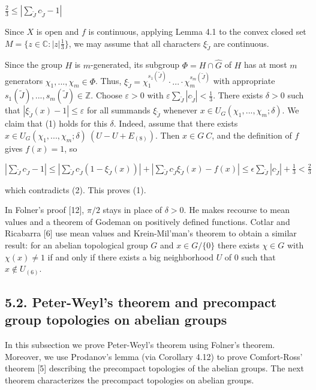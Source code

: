 \documentclass[12pt]{article}
\begin{document}
    $\frac{2}{3} \leqslant |\sum_{\tilde{J}} c_{\tilde{J}} - 1|$


    Since $X$ is open and $f$ is continuous, applying Lemma 4.1 to the convex closed set $M = \{z \in \mathbb{C}: |z|  \frac{1}{3}\}$, we may assume
that all characters $\xi_{\tilde{J}}$ are continuous.


Since the group $H$ is $m$-generated, its subgroup $\Phi = H \cap \hat{G}$ of $H$ has at most $m$ generators $\chi_1,...,\chi_m \in \Phi$. Thus,
$\xi_{\tilde{J}} = \chi^{s_1(\tilde{J})}_1 \cdot ... \cdot \chi^{s_m(\tilde{J})}_m$ with appropriate $s_1(\tilde{J}), . . . , s_m(\tilde{J}) \in \mathbb{Z}$. Choose $\varepsilon > 0$ with $\varepsilon \sum_\tilde{J} |c_\tilde{J}| < \frac{1}{3}$. There exists $\delta > 0$ such that
$|\xi_{\tilde{J}}(x) - 1| \leqslant \varepsilon$ for all summands $\xi_{\tilde{J}}$ whenever $x \in U_G (\chi_1,...,\chi_m; \delta)$. We claim that (1) holds for this $\delta$. Indeed, assume that
there exists $x \in U_G (\chi_1,...,\chi_m; \delta) \ (U - U + E_{(8)})$. Then $x \in G \ C$, and the definition of $f$ gives $f(x) = 1$, so


$|\sum_{\tilde{J}} c_{\tilde{J}} - 1| \leqslant |\sum_{\tilde{J}} c_{\tilde{J}}(1 - \xi_{\tilde{J}}(x))| + |\sum_{\tilde{J}} c_{\tilde{J}} \xi_{\tilde{J}}(x) - f(x)| \leqslant \epsilon \sum_{\tilde{J}} |c_{\tilde{J}}| + \frac{1}{3} < \frac{2}{3}$


which contradicts (2). This proves (1). 


    In Folner's proof [12], $\pi /2$ stays in place of $\delta > 0$. He makes recourse to mean values and a theorem of Godeman on
positively defined functions. Cotlar and Ricabarra [6] use mean values and Krein-Mil'man's theorem to obtain a similar
result: for an abelian topological group $G$ and $x \in G / \{0\}$ there exists $\chi \in G$ with $\chi(x) \neq 1$ if and only if there exists a big
neighborhood $U$ of 0 such that $x \notin  U_{(6)}$.


\subsection{5.2. Peter-Weyl's theorem and precompact group topologies on abelian groups}


    In this subsection we prove Peter-Weyl's theorem using Folner's theorem. Moreover, we use Prodanov's lemma (via
Corollary 4.12) to prove Comfort-Ross' theorem [5] describing the precompact topologies of the abelian groups.
The next theorem characterizes the precompact topologies on abelian groups.
\end{document}
